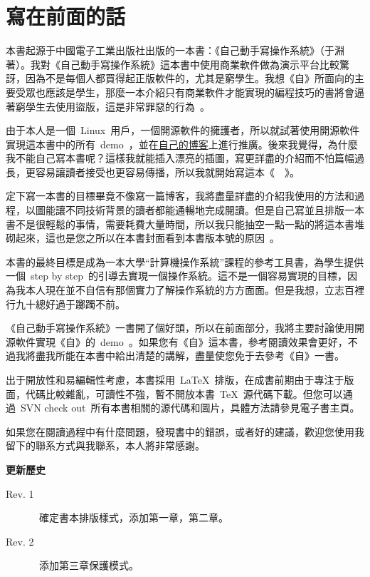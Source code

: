\chapter{寫在前面的話} \label{fore}


\begin{kaitext}

本書起源于中國電子工業出版社出版的一本書：《自己動手寫操作系統》（于淵著）。我對《自己動手寫操作系統》這本書中使用商業軟件做為演示平台比較驚訝，因為不是每個人都買得起正版軟件的，尤其是窮學生。我想《自》所面向的主要受眾也應該是學生，那麼一本介紹只有商業軟件才能實現的編程技巧的書將會逼著窮學生去使用盜版，這是非常罪惡的行為~\frownie。

由于本人是一個~Linux~用戶，一個開源軟件的擁護者，所以就試著使用開源軟件實現這本書中的所有~demo~，並在\href{http://blog.solrex.cn}{自己的博客}上進行推廣。後來我覺得，為什麼我不能自己寫本書呢？這樣我就能插入漂亮的插圖，寫更詳盡的介紹而不怕篇幅過長，更容易讓讀者接受也更容易傳播，所以我就開始寫這本《~\BookName~》。

定下寫一本書的目標畢竟不像寫一篇博客，我將盡量詳盡的介紹我使用的方法和過程，以圖能讓不同技術背景的讀者都能通暢地完成閱讀。但是自己寫並且排版一本書不是很輕鬆的事情，需要耗費大量時間，所以我只能抽空一點一點的將這本書堆砌起來，這也是您之所以在本書封面看到本書版本號的原因~\smiley。

本書的最終目標是成為一本大學“計算機操作系統”課程的參考工具書，為學生提供一個~step by step~的引導去實現一個操作系統。這不是一個容易實現的目標，因為我本人現在並不自信有那個實力了解操作系統的方方面面。但是我想，立志百裡行九十總好過于躑躅不前。

《自己動手寫操作系統》一書開了個好頭，所以在前面部分，我將主要討論使用開源軟件實現《自》的~demo~。如果您有《自》這本書，參考閱讀效果會更好，不過我將盡我所能在本書中給出清楚的講解，盡量使您免于去參考《自》一書。

出于開放性和易編輯性考慮，本書採用~\LaTeX~排版，在成書前期由于專注于版面，代碼比較雜亂，可讀性不強，暫不開放本書~\TeX~源代碼下載。但您可以通過~SVN check out~所有本書相關的源代碼和圖片，具體方法請參見電子書主頁。

如果您在閱讀過程中有什麼問題，發現書中的錯誤，或者好的建議，歡迎您使用我留下的聯系方式與我聯系，本人將非常感謝。
\vskip 1cm
\noindent
{}
\end{kaitext}

\begin{lined}{\textwidth}
\textbf{更新歷史}
\small
\begin{description}
    \item[Rev. 1]~確定書本排版樣式，添加第一章，第二章。
    \item[Rev. 2]~添加第三章保護模式。
\end{description}
\vspace{2ex}
\end{lined}


